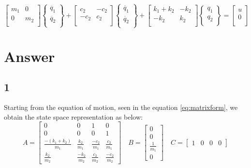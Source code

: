 \begin{equation}
	\label{eq:matrixform}
	\begin{bmatrix}
		m_1 & 0 \\
		0 	&	m_2 \\
	\end{bmatrix}
	\begin{Bmatrix}
		\ddot{q_1}\\
		\ddot{q_2}\\
	\end{Bmatrix} +
	\begin{bmatrix}
		c_2 & -c_2 \\
		-c_2 	&	c_2 \\
	\end{bmatrix}
	\begin{Bmatrix}
		\dot{q_1}\\
		\dot{q_2}\\
	\end{Bmatrix}+
	\begin{bmatrix}
		k_1+k_2 & -k_2 \\
		-k_2 	&	k_2 \\
	\end{bmatrix}
	\begin{Bmatrix}
		q_1\\
		q_2\\
	\end{Bmatrix}
	=
	\begin{bmatrix}
		u \\
		0 \\
	\end{bmatrix}
\end{equation}


\section{Answer}
\subsection{1}
Starting from the equation of motion, seen in the equation \eqref{eq:matrixform},
we obtain the state space representation as below:
\[
	A =
	\begin{bmatrix}
		0  	& 		0 		&      1	 	&     0\\
		0 	&     0 		&      0 		&     1\\
		\frac{-(k_1 + k_2)}{m_1} & \frac{k_2}{m_1} & \frac{-c_2}{m_1} & \frac{c_2}{m_1}\\
		\frac{k_2}{m_2} & \frac{-k_2}{m_2} & \frac{c_2}{m_2} & \frac{-c_2}{m_2}
	\end{bmatrix}\quad
	B =
	\begin{bmatrix}
		0\\
		0\\
		\frac{1}{m_1}\\
		0
	\end{bmatrix}\quad
	C =
	\begin{bmatrix}
		1   &  0   &  0  &   0
	\end{bmatrix}
\]

